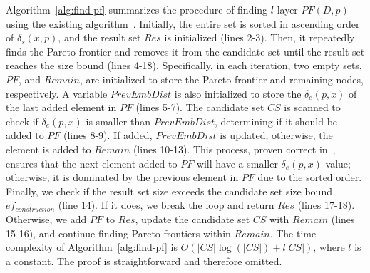 Algorithm~\ref{alg:find-pf} summarizes the procedure of finding $l$-layer $PF(D, p)$ using the existing algorithm~\cite{borzsony2001skyline}. Initially, the entire set is sorted in ascending order of $\delta_s(x, p)$, and the result set $Res$ is initialized (lines 2-3). Then, it repeatedly finds the Pareto frontier and removes it from the candidate set until the result set reaches the size bound (lines 4-18). 
Specifically, in each iteration, two empty sets, $PF$, and $Remain$, are initialized to store the Pareto frontier and remaining nodes, respectively. A variable $PrevEmbDist$ is also initialized to store the $\delta_e(p, x)$ of the last added element in $PF$ (lines 5-7). The candidate set $CS$ is scanned to check if $\delta_e(p, x)$ is smaller than $PrevEmbDist$, determining if it should be added to $PF$ (lines 8-9). If added, $PrevEmbDist$ is updated; otherwise, the element is added to $Remain$ (lines 10-13). This process, proven correct in~\cite{borzsony2001skyline}, ensures that the next element added to $PF$ will have a smaller $\delta_e(p, x)$ value; otherwise, it is dominated by the previous element in $PF$ due to the sorted order. %
Finally, we check if the result set size exceeds the candidate set size bound $ef_{construction}$ (line 14). If it does, we break the loop and return $Res$ (lines 17-18). Otherwise, we add $PF$ to $Res$, update the candidate set $CS$ with $Remain$ (lines 15-16), and continue finding Pareto frontiers within $Remain$. The time complexity of Algorithm~\ref{alg:find-pf} is $O(|CS|\log(|CS|)+l|CS|)$, where $l$ is a constant. %
The proof is straightforward and therefore omitted.

